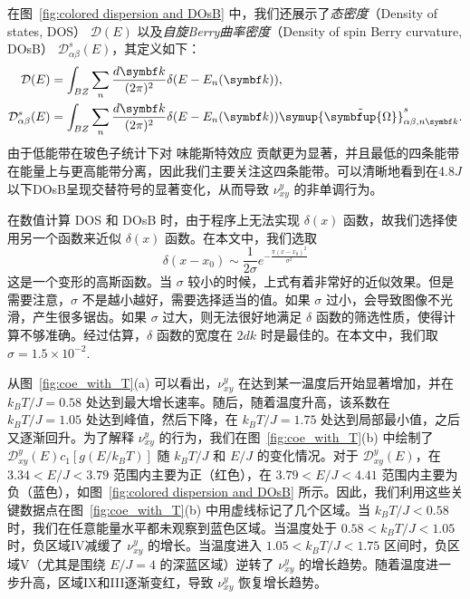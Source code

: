         在图~\ref{fig:colored dispersion and DOsB} 中，我们还展示了\emph{态密度}（Density of states, DOS） $\mathcal{D}(E)$ 以及\emph{自旋Berry曲率密度}（Density of spin Berry curvature, DOsB） $\mathcal{D}^s_{\alpha\beta}(E)$，其定义如下：
        \begin{align}
            \mathcal{D}(E)&= \int_{BZ} \sum_n \frac{d{\bm{k}}}{(2\pi)^2} \delta(E - E_n({\bm{k}})),\\
            \mathcal{D}^s_{\alpha\beta}(E)&= \int_{BZ} \sum_n \frac{d{\bm{k}}}{(2\pi)^2} \delta(E - E_n({\bm{k}})) \symup{\tilde{\symbfup{\Omega}}}^s_{\alpha\beta,n{\bm{k}}}.
        \end{align}
        由于低能带在玻色子统计下对 味能斯特效应 贡献更为显著，并且最低的四条能带在能量上与更高能带分离，因此我们主要关注这四条能带。可以清晰地看到在4.8$J$以下DOsB呈现交替符号的显著变化，从而导致 $\nu^y_{xy}$ 的非单调行为。
        
        在数值计算 DOS 和 DOsB 时，由于程序上无法实现 $\delta(x)$ 函数，故我们选择使用另一个函数来近似 $\delta(x)$ 函数。在本文中，我们选取
        \begin{equation}
            \delta(x-x_0) \sim \frac{1}{2\sigma } e^{-\frac{\pi ( x-x_{0})^{2}}{\sigma ^{2}}}
        \end{equation}
        这是一个变形的高斯函数。当 $\sigma$ 较小的时候，上式有着非常好的近似效果。但是需要注意，$\sigma$ 不是越小越好，需要选择适当的值。如果 $\sigma$ 过小，会导致图像不光滑，产生很多锯齿。如果 $\sigma$ 过大，则无法很好地满足 $\delta$ 函数的筛选性质，使得计算不够准确。经过估算，$\delta$ 函数的宽度在 $2dk$ 时是最佳的。在本文中，我们取 $\sigma = 1.5 \times 10^{-2}$.

        从图~\ref{fig:coe_with_T}(a) 可以看出，$\nu^y_{xy}$ 在达到某一温度后开始显著增加，并在 $k_B T/J=0.58$ 处达到最大增长速率。随后，随着温度升高，该系数在 $k_B T/J=1.05$ 处达到峰值，然后下降，在 $k_B T/J=1.75$ 处达到局部最小值，之后又逐渐回升。为了解释 $\nu^y_{xy}$ 的行为，我们在图~\ref{fig:coe_with_T}(b) 中绘制了 $\mathcal{D}^y_{xy}(E) c_1[g(E/k_B T)]$ 随 $k_B T/J$ 和 $E/J$ 的变化情况。对于 $\mathcal{D}^y_{xy}(E)$，在 $3.34 <E/J <3.79$ 范围内主要为正（红色），在 $3.79< E/J <4.41$ 范围内主要为负（蓝色），如图~\ref{fig:colored dispersion and DOsB} 所示。因此，我们利用这些关键数据点在图~\ref{fig:coe_with_T}(b) 中用虚线标记了几个区域。当 $k_B T/J<0.58$ 时，我们在任意能量水平都未观察到蓝色区域。当温度处于 $0.58< k_B T/J <1.05$ 时，负区域IV减缓了 $\nu^y_{xy}$ 的增长。当温度进入 $1.05< k_B T/J <1.75$ 区间时，负区域V（尤其是围绕 $E/J=4$ 的深蓝区域）逆转了 $\nu^y_{xy}$ 的增长趋势。随着温度进一步升高，区域IX和III逐渐变红，导致 $\nu^y_{xy}$ 恢复增长趋势。

